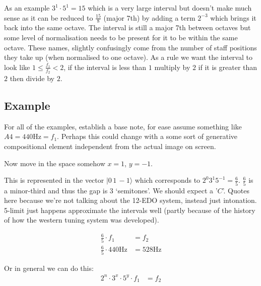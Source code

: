 As an example $3^1 \cdot 5^1 = 15$ which is a very large interval but doesn't make much sense as it
can be reduced to $\frac{15}{8}$ (major 7th) by adding a term $2^{-3}$ which brings it back into the
same octave. The interval is still a major 7th between octaves but some level of normalisation
needs to be present for it to be within the same octave. These names, slightly confusingly come from
the number of staff positions they take up (when normalised to one octave). As a rule we want the
interval to look like $1 \leq \frac{f_1}{f_2} < 2$, if the interval is less than $1$ multiply by $2$
if it is greater than $2$ then divide by $2$.

\subsection{Example}
For all of the examples, establish a base note, for ease assume something like $A4 = 440\si{\hertz}
= f_1$. Perhaps this could change with a some sort of generative compositional element independent
from the actual image on screen.

Now move in the space somehow $x=1$, $y=-1$.

\begin{center}
\end{center}

This is represented in the vector $|0\, 1\, -1\rangle$ which corresponds to $2^0 3^1 5^{-1} =
\frac{6}{5}$. $\frac{6}{5}$ is a minor-third and thus the gap is 3 `semitones'. We should expect a
'$C$'. Quotes here because we're not talking about the 12-EDO system, instead just intonation.
5-limit just happens approximate the intervals well (partly because of the history of how the
western tuning system was developed).

\begin{align*}
    \frac{6}{5} \cdot f_1 &= f_2\\
    \frac{6}{5} \cdot 440\si{\hertz} &= 528\si{\hertz}
\end{align*}

Or in general we can do this:
\begin{align*}
    2^n \cdot 3^x \cdot 5^y \cdot f_1 &= f_2\\
\end{align*}

